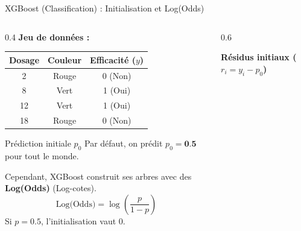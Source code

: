 \begin{frame}{XGBoost (Classification) : Initialisation et Log(Odds)}
    \begin{columns}[T]
        \begin{column}{0.4\textwidth}
            \textbf{Jeu de données :}
            \vspace{0.1cm}
            
            \begin{table}
                \centering
                \scriptsize
                \begin{tabular}{|c|c|c|}
                    \hline
                    \textbf{Dosage} & \textbf{Couleur} & \textbf{Efficacité ($y$)} \\
                    \hline
                    2 & Rouge & 0 (Non) \\
                    8 & Vert & 1 (Oui) \\
                    12 & Vert & 1 (Oui) \\
                    18 & Rouge & 0 (Non) \\
                    \hline
                \end{tabular}
            \end{table}
            
            \begin{block}{Prédiction initiale $p_0$}
                \scriptsize
                Par défaut, on prédit $p_0 = \textbf{0.5}$ pour tout le monde.
                
                \vspace{0.1cm}
                Cependant, XGBoost construit ses arbres avec des \textbf{Log(Odds)} (Log-cotes).
                $$ \text{Log(Odds)} = \log\left(\frac{p}{1-p}\right) $$
                Si $p=0.5$, l'initialisation vaut $0$.
            \end{block}
        \end{column}
        
        \begin{column}{0.6\textwidth}
            \begin{center}
            \textbf{\footnotesize Résidus initiaux ($r_i = y_i - p_0$)}
            
            \vspace{0.2cm}
\end{center}
\end{column}
\end{columns}
\end{frame}
